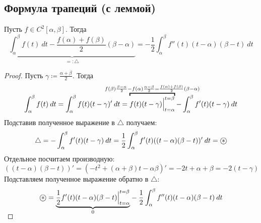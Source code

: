 \subsection{Формула трапеций (с леммой)}
\begin{lemma}
    Пусть $f \in C^{2}[\alpha, \beta]$. Тогда
    \begin{equation*}
        \underbrace{\int_{\alpha}^{\beta} f(t) \: dt - \frac{f(\alpha) + f(\beta)}{2}(\beta - \alpha)}_{=: \triangle} =
        -\frac{1}{2} \int_{\alpha}^{\beta} f''(t)(t - \alpha)(\beta - t) \: dt
    \end{equation*}
\end{lemma}
\begin{proof}
    Пусть $\gamma \coloneqq \frac{\alpha + \beta}{2}$. Тогда
    \begin{equation*}
            \int_{\alpha}^{\beta} f(t) \: dt = \int_{\alpha}^{\beta} f(t)(t - \gamma)'
            \: dt = \overbracket{f(t)(t - \gamma) \Big|_{t = \alpha}^{t = \beta}}^
            {\mathclap{f(\beta)\frac{\beta - \alpha}{2} - f(\alpha)\frac{\alpha - \beta}{2}
            = \frac{f(\alpha) + f(\beta)}{2}(\beta - \alpha)}}
            -\int_{\alpha}^{\beta} f'(t)(t - \gamma) \: dt
    \end{equation*}
    Подставив полученное выражение в $\triangle$ получаем:
    \begin{equation*}
            \triangle = - \int_{\alpha}^{\beta} f'(t)(t - \gamma) \: dt = \frac{1}{2}
            \int_{{\alpha}}^{{\beta}} {f'(t)((t - \alpha)(\beta - t))'} \: d{t}
            = \oast
    \end{equation*}
    Отдельное посчитаем производную:
    \begin{equation*}
            ((t - \alpha)(\beta - t))' = (-t^2 + (\alpha + \beta)t - \alpha\beta)' =
            -2t + \alpha + \beta = -2(t - \gamma)
    \end{equation*}
    Подставляем полученное выражение обратно в $\triangle$:
    \begin{equation*}
            \oast =
            \smash{\underbrace{\frac{1}{2} f'(t)(t - \alpha)(\beta - t) \Big|_{t = \alpha}^{t = \beta}}_{0}}
            - \frac{1}{2} \int_{{\alpha}}^{{\beta}} {f''(t)(t - \alpha)(\beta - t)} \: d{t}
    \end{equation*}
\end{proof}

